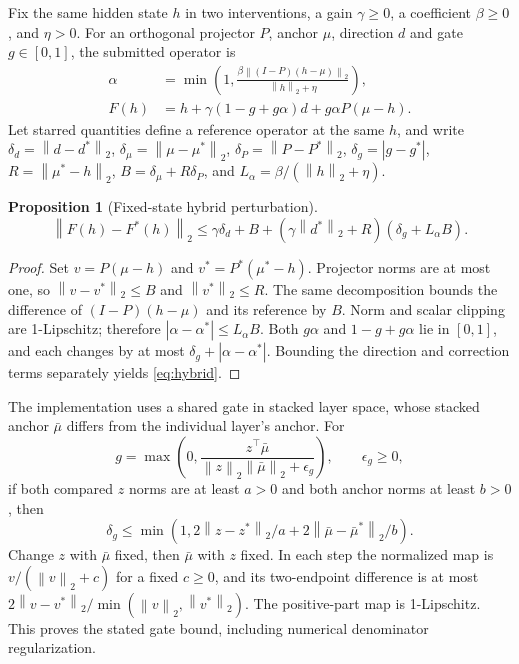 \documentclass[11pt]{article}
\newtheorem{proposition}{Proposition}
\newcommand{\norm}[1]{\left\lVert#1\right\rVert}
\begin{document}
Fix the same hidden state $h$ in two interventions, a gain $\gamma\geq0$, a
coefficient $\beta\geq0$, and $\eta>0$. For an orthogonal projector $P$,
anchor $\mu$, direction $d$ and gate $g\in[0,1]$, the submitted operator is
\begin{align*}
 \alpha&=\min\!\left(1,\frac{\beta\norm{(I-P)(h-\mu)}_2}{\norm h_2+\eta}\right),\\
 F(h)&=h+\gamma(1-g+g\alpha)d+g\alpha P(\mu-h).
\end{align*}
Let starred quantities define a reference operator at the same $h$, and write
$\delta_d=\norm{d-d^*}_2$, $\delta_\mu=\norm{\mu-\mu^*}_2$,
$\delta_P=\norm{P-P^*}_2$, $\delta_g=|g-g^*|$,
$R=\norm{\mu^*-h}_2$, $B=\delta_\mu+R\delta_P$, and
$L_\alpha=\beta/(\norm h_2+\eta)$.
\begin{proposition}[Fixed-state hybrid perturbation]
\begin{equation}\label{eq:hybrid}
 \norm{F(h)-F^*(h)}_2\leq
 \gamma\delta_d+B+(\gamma\norm{d^*}_2+R)
                    (\delta_g+L_\alpha B).
\end{equation}
\end{proposition}
\begin{proof}
Set $v=P(\mu-h)$ and $v^*=P^*(\mu^*-h)$. Projector norms are at most one, so
$\norm{v-v^*}_2\leq B$ and $\norm{v^*}_2\leq R$. The same decomposition
bounds the difference of $(I-P)(h-\mu)$ and its reference by $B$.
Norm and scalar clipping are 1-Lipschitz; therefore
$|\alpha-\alpha^*|\leq L_\alpha B$. Both $g\alpha$ and $1-g+g\alpha$
lie in $[0,1]$, and each changes by at most
$\delta_g+|\alpha-\alpha^*|$. Bounding the direction and correction terms
separately yields \eqref{eq:hybrid}.
\end{proof}

The implementation uses a shared gate in stacked layer space, whose stacked
anchor $\bar\mu$ differs from the individual layer's anchor. For
\[
 g=\max\!\left(0,\frac{z^\top\bar\mu}
                  {\norm z_2\norm{\bar\mu}_2+\epsilon_g}\right),
 \qquad\epsilon_g\geq0,
\]
if both compared $z$ norms are at least $a>0$ and both anchor norms at least
$b>0$, then
\[
 \delta_g\leq\min\!\left(1,
      2\norm{z-z^*}_2/a+2\norm{\bar\mu-\bar\mu^*}_2/b\right).
\]
Change $z$ with $\bar\mu$ fixed, then $\bar\mu$ with $z$ fixed. In each
step the normalized map is $v/(\norm v_2+c)$ for a fixed $c\geq0$, and its
two-endpoint difference is at most $2\norm{v-v^*}_2/\min(\norm v_2,\norm{v^*}_2)$.
The positive-part map is 1-Lipschitz. This proves the stated gate bound,
including numerical denominator regularization.
\end{document}
